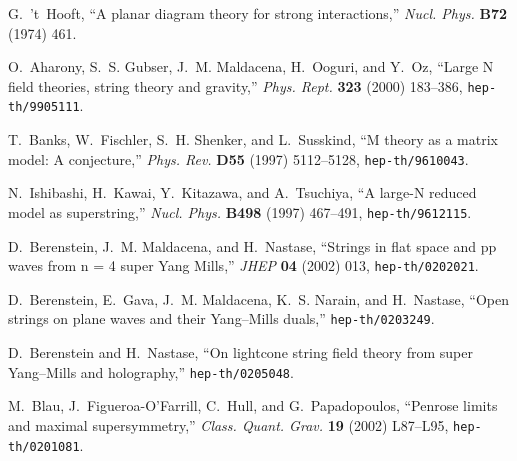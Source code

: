 \documentclass[a4paper]{article}
\begin{document}
%
%
\providecommand{\href}[2]{#2}\begingroup\raggedright\begin{thebibliography}{10}

G.~'t~Hooft, ``A planar diagram theory for strong interactions,'' {\em Nucl.
  Phys.} {\bf B72} (1974)
461.

O.~Aharony, S.~S. Gubser, J.~M. Maldacena, H.~Ooguri, and Y.~Oz,
``Large N field theories, string theory and gravity,'' {\em Phys.
Rept.} {\bf 323}
  (2000) 183--386,
\href{http://arXiv.org/abs/hep-th/9905111}{{\tt hep-th/9905111}}.

T.~Banks, W.~Fischler, S.~H. Shenker, and L.~Susskind, ``M theory as a matrix
  model: A conjecture,'' {\em Phys. Rev.} {\bf D55} (1997) 5112--5128,
\href{http://arXiv.org/abs/hep-th/9610043}{{\tt hep-th/9610043}}.

N.~Ishibashi, H.~Kawai, Y.~Kitazawa, and A.~Tsuchiya, ``A large-N
reduced model
  as superstring,'' {\em Nucl. Phys.} {\bf B498} (1997) 467--491,
\href{http://arXiv.org/abs/hep-th/9612115}{{\tt hep-th/9612115}}.

D.~Berenstein, J.~M. Maldacena, and H.~Nastase, ``Strings in flat space and pp
  waves from n = 4 super Yang Mills,'' {\em JHEP} {\bf 04} (2002) 013,
\href{http://arXiv.org/abs/hep-th/0202021}{{\tt hep-th/0202021}}.

D.~Berenstein, E.~Gava, J.~M. Maldacena, K.~S. Narain, and H.~Nastase, ``Open
  strings on plane waves and their Yang--Mills duals,''
\href{http://arXiv.org/abs/hep-th/0203249}{{\tt hep-th/0203249}}.

D.~Berenstein and H.~Nastase, ``On lightcone string field theory from super
  Yang--Mills and holography,''
\href{http://arXiv.org/abs/hep-th/0205048}{{\tt hep-th/0205048}}.

M.~Blau, J.~Figueroa-O'Farrill, C.~Hull, and G.~Papadopoulos, ``Penrose limits
  and maximal supersymmetry,'' {\em Class. Quant. Grav.} {\bf 19} (2002)
  L87--L95,
\href{http://arXiv.org/abs/hep-th/0201081}{{\tt hep-th/0201081}}.


\end{thebibliography}
\end{document}
